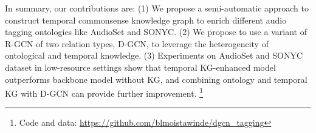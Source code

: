 In summary, our contributions are: 
(1) We propose a semi-automatic approach to construct temporal commonsense knowledge graph to enrich different audio tagging ontologies like AudioSet and SONYC.
(2) We propose to use a variant of R-GCN of two relation types, D-GCN, 
to leverage the heterogeneity of ontological and temporal knowledge.
(3) Experiments on AudioSet and SONYC dataset in low-resource settings show 
that temporal KG-enhanced model outperforms backbone model without KG, and 
combining ontology and temporal KG with D-GCN can provide further improvement. \footnote{Code and data: \url{https://github.com/blmoistawinde/dgcn_tagging}}


